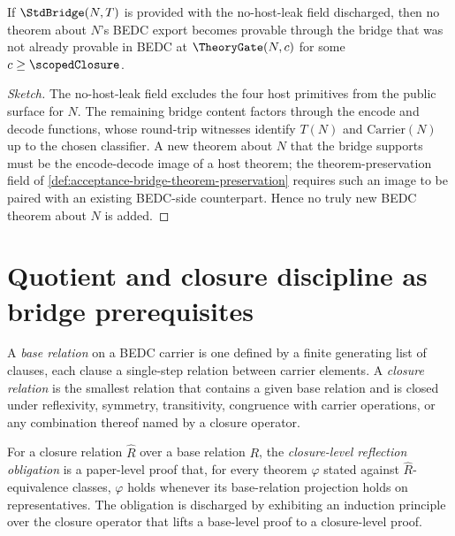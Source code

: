 \begin{theorem}
\label{thm:acceptance-bridge-conservative}
If $\StdBridge(N,T)$ is provided with the no-host-leak field discharged, then no theorem about $N$'s BEDC export becomes provable through the bridge that was not already provable in BEDC at $\TheoryGate(N, c)$ for some $c \ge \scopedClosure$.
\end{theorem}
\begin{proof}[Sketch]
The no-host-leak field excludes the four host primitives from the public surface for $N$. The remaining bridge content factors through the encode and decode functions, whose round-trip witnesses identify $T(N)$ and $\mathrm{Carrier}(N)$ up to the chosen classifier. A new theorem about $N$ that the bridge supports must be the encode-decode image of a host theorem; the theorem-preservation field of \autoref{def:acceptance-bridge-theorem-preservation} requires such an image to be paired with an existing BEDC-side counterpart. Hence no truly new BEDC theorem about $N$ is added.
\end{proof}

\section{Quotient and closure discipline as bridge prerequisites}
\label{sec:acceptance-bridge-quotient-closure}

\begin{definition}
\label{def:acceptance-base-vs-closure}
A \emph{base relation} on a BEDC carrier is one defined by a finite generating list of clauses, each clause a single-step relation between carrier elements. A \emph{closure relation} is the smallest relation that contains a given base relation and is closed under reflexivity, symmetry, transitivity, congruence with carrier operations, or any combination thereof named by a closure operator.
\end{definition}

\begin{definition}
\label{def:acceptance-closure-reflection-obligation}
For a closure relation $\widehat{R}$ over a base relation $R$, the \emph{closure-level reflection obligation} is a paper-level proof that, for every theorem $\varphi$ stated against $\widehat{R}$-equivalence classes, $\varphi$ holds whenever its base-relation projection holds on representatives. The obligation is discharged by exhibiting an induction principle over the closure operator that lifts a base-level proof to a closure-level proof.
\end{definition}

